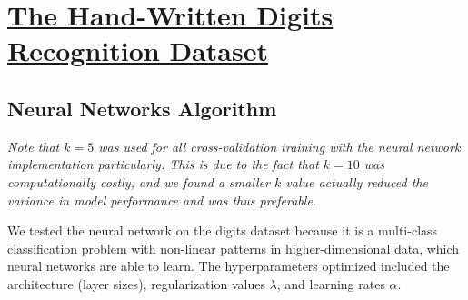 \documentclass{article}
\begin{document}







\newpage
{} 



\section{\underline{The Hand-Written Digits Recognition Dataset}}
\subsection{Neural Networks Algorithm}


\textit{Note that $k=5$ was used for all cross-validation training with the neural network implementation particularly. This is due to the fact that $k=10$ was computationally costly, and we found a smaller $k$ value actually reduced the variance in model performance and was thus preferable. }

We tested the neural network on the digits dataset because it is a multi-class classification problem with non-linear patterns in higher-dimensional data, which neural networks are able to learn. The hyperparameters optimized included the architecture (layer sizes), regularization values $\lambda$, and learning rates $\alpha$. 
\end{document}
